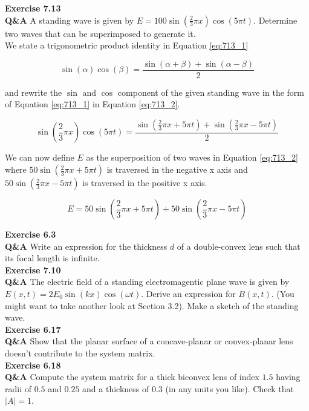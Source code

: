 \documentclass[main.tex]{subfiles}
\begin{document}
\textbf{Exercise 7.13}\\ %
\textbf{Q\&A} A standing wave is given by $E=100\sin(\frac{2}{3}\pi x) \cos( 5\pi t )$. Determine two waves that can be superimposed to generate it.\\

We state a trigonometric product identity in Equation \ref{eq:713_1}

\begin{equation}\label{eq:713_1}
\sin(\alpha)\cos(\beta) = \frac{\sin(\alpha + \beta) + \sin(\alpha - \beta)}{2}
\end{equation}

and rewrite the $\sin$ and $\cos$ component of the given standing wave in the form of Equation \ref{eq:713_1} in Equation \ref{eq:713_2}.

\begin{equation}\label{eq:713_2}
\sin(\frac{2}{3}\pi x)\cos(5\pi t) = \frac{\sin(\frac{2}{3}\pi x + 5\pi t) + \sin(\frac{2}{3}\pi x - 5\pi t)}{2}
\end{equation}

We can now define $E$ as the superposition of two waves in Equation \ref{eq:713_2} where $50 \sin(\frac{2}{3}\pi x + 5\pi t)$ is traversed in the negative x axis and $50 \sin(\frac{2}{3}\pi x - 5\pi t)$ is traversed in the positive x axis.

\begin{equation}\label{eq:713_2}
E = 50 \sin(\frac{2}{3}\pi x + 5\pi t) + 50 \sin(\frac{2}{3}\pi x - 5\pi t)
\end{equation}

\textbf{Exercise 6.3}\\
\textbf{Q\&A} Write an  expression for the thickness $d$ of a double-convex lens such that its focal length is infinite.\\

\textbf{Exercise 7.10}\\
\textbf{Q\&A} The electric field of a standing electromagentic plane wave is given by $E(x,t) = 2E_0 \sin (kx) \cos(\omega t)$. Derive an expression for $B(x,t)$. (You might want to take another look at Section 3.2). Make a sketch of the standing wave.\\

\textbf{Exercise 6.17}\\
\textbf{Q\&A} Show that the planar surface of a concave-planar or convex-planar lens doesn't contribute to the system matrix.\\

\textbf{Exercise 6.18}\\
\textbf{Q\&A} Compute the system matrix for a thick biconvex lens of index $1.5$ having radii of $0.5$ and $0.25$ and a thickness of $0.3$ (in any units you like). Check that $|A| = 1$.\\
\end{document}
